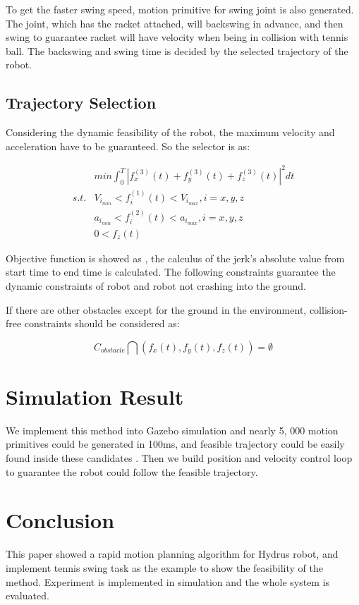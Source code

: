 \documentclass{jarticle}
\begin{document}
To get the faster swing speed, motion primitive for swing joint is also generated. The joint, which has the racket attached, will backswing in advance, and then swing to guarantee racket will have velocity when being in collision with tennis ball. The backswing and swing time is decided by the selected trajectory of the robot.

\subsection{Trajectory Selection}
Considering the dynamic feasibility of the robot, the maximum velocity and acceleration have to be guaranteed. So the selector is as:

\begin{eqnarray}
  \label{eq:temp3}
 & min{\int_0^T |f^{(3)}_x(t) + f^{(3)}_y(t) + f^{(3)}_z(t)|^2 dt}   \\
  \label{eq:temp4}
s.t. &  V_{i_{min}} < f^{(1)}_i(t) < V_{i_{max}}, i = x, y, z \nonumber \\
  \label{eq:temp5}
 & a_{i_{min}} < f^{(2)}_i(t) < a_{i_{max}}, i = x, y, z \nonumber \\
  \label{eq:temp6}
 & 0 < f_z(t) \nonumber
\end{eqnarray}

Objective function is showed as , the calculus of the jerk’s absolute value from start time to end time is calculated. The following constraints guarantee the dynamic constraints of robot and robot not crashing into the ground.

If there are other obstacles except for the ground in the environment, collision-free constraints should be considered as:

\begin{equation}
  \label{eq:temp7}
  C_{obstacle}\bigcap (f_x(t), f_y(t), f_z(t)) =\emptyset
\end{equation}


\section{Simulation Result}
We implement this method into Gazebo simulation and nearly 5, 000 motion primitives could be generated in 100ms, and feasible trajectory could be easily found inside these candidates . Then we build position and velocity control loop to guarantee the robot could follow the feasible trajectory.

\section{Conclusion}
This paper showed a rapid motion planning algorithm for Hydrus robot, and implement tennis swing task as the example to show the feasibility of the method. Experiment is implemented in simulation and the whole system is evaluated.
\end{document}

